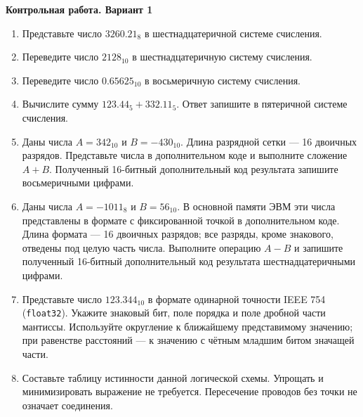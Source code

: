 \documentclass[a4paper,14pt]{extreport}
\begin{document}
\begin{center}
    \textbf{Контрольная работа. Вариант 1}
\end{center}

\begin{enumerate}
    \item Представьте число $3260.21_8$ в шестнадцатеричной системе счисления.

    \item Переведите число $2128_{10}$ в шестнадцатеричную систему счисления.

    \item Переведите число $0.65625_{10}$ в восьмеричную систему счисления.

    \item Вычислите сумму $123.44_5 + 332.11_5$. Ответ запишите в пятеричной системе счисления.

    \item Даны числа $A=342_{10}$ и $B=-430_{10}$. Длина разрядной сетки --- 16 двоичных разрядов. Представьте числа в дополнительном коде и выполните сложение $A+B$. Полученный 16-битный дополнительный код результата запишите восьмеричными цифрами.

    \item Даны числа $A=-1011_8$ и $B=56_{10}$. В основной памяти ЭВМ эти числа представлены в формате с фиксированной точкой в дополнительном коде. Длина формата --- 16 двоичных разрядов; все разряды, кроме знакового, отведены под целую часть числа. Выполните операцию $A-B$ и запишите полученный 16-битный дополнительный код результата шестнадцатеричными цифрами.

    \item Представьте число $123.344_{10}$ в формате одинарной точности IEEE 754 (\texttt{float32}). Укажите знаковый бит, поле порядка и поле дробной части мантиссы. Используйте округление к ближайшему представимому значению; при равенстве расстояний --- к значению с чётным младшим битом значащей части.

    \item Составьте таблицу истинности данной логической схемы. Упрощать и минимизировать выражение не требуется. Пересечение проводов без точки не означает соединения.
    \krCommonScheme
\end{enumerate}
\end{document}

